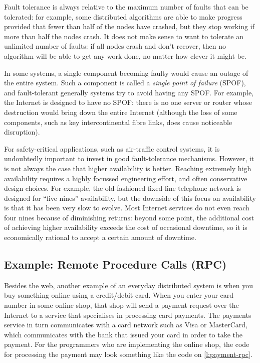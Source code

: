 Fault tolerance is always relative to the maximum number of faults that can be tolerated: for example, some distributed algorithms are able to make progress provided that fewer than half of the nodes have crashed, but they stop working if more than half the nodes crash.
It does not make sense to want to tolerate an unlimited number of faults: if all nodes crash and don't recover, then no algorithm will be able to get any work done, no matter how clever it might be.

In some systems, a single component becoming faulty would cause an outage of the entire system.
Such a component is called a \emph{single point of failure} (SPOF), and fault-tolerant generally systems try to avoid having any SPOF.
For example, the Internet is designed to have no SPOF: there is no one server or router whose destruction would bring down the entire Internet (although the loss of some components, such as key intercontinental fibre links, does cause noticeable disruption).


For safety-critical applications, such as air-traffic control systems, it is undoubtedly important to invest in good fault-tolerance mechanisms.
However, it is not always the case that higher availability is better.
Reaching extremely high availability requires a highly focussed engineering effort, and often conservative design choices.
For example, the old-fashioned fixed-line telephone network is designed for ``five nines'' availability, but the downside of this focus on availability is that it has been very slow to evolve.
Most Internet services do not even reach four nines because of diminishing returns: beyond some point, the additional cost of achieving higher availability exceeds the cost of occasional downtime, so it is economically rational to accept a certain amount of downtime.

\subsection{Example: Remote Procedure Calls (RPC)}\label{sec:rpc}

Besides the web, another example of an everyday distributed system is when you buy something online using a credit/debit card.
When you enter your card number in some online shop, that shop will send a payment request over the Internet to a service that specialises in processing card payments.
The payments service in turn communicates with a card network such as Visa or MasterCard, which communicates with the bank that issued your card in order to take the payment.
For the programmers who are implementing the online shop, the code for processing the payment may look something like the code on \autoref{l:payment-rpc}.

